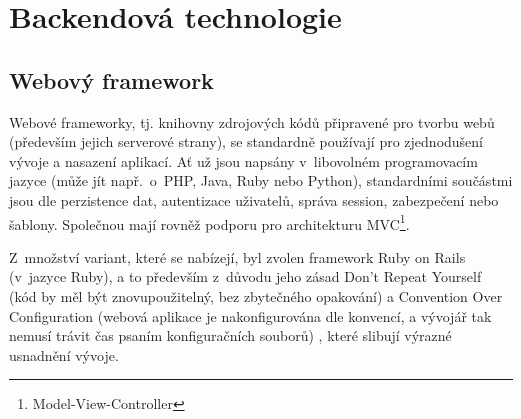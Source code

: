 \documentclass[twoside]{ctuthesis}
\begin{document}
\section{Backendová technologie}

\subsection{Webový framework}

Webové frameworky, tj. knihovny zdrojových kódů připravené pro tvorbu webů (především jejich serverové strany), se standardně používají pro zjednodušení vývoje a nasazení aplikací. Ať už jsou napsány v~libovolném programovacím jazyce (může jít např.~o~PHP, Java, Ruby nebo Python), standardními součástmi jsou dle \cite{docforge2014web} perzistence dat, autentizace uživatelů, správa session, zabezpečení nebo šablony. Společnou mají rovněž podporu pro  architekturu MVC\footnote{Model-View-Controller}.

Z~množství variant, které se nabízejí, byl zvolen framework Ruby on Rails (v~jazyce Ruby), a to především z~důvodu jeho zásad Don't Repeat Yourself (kód by měl být znovupoužitelný, bez zbytečného opakování) a Convention Over Configuration (webová aplikace je nakonfigurována dle konvencí, a vývojář tak nemusí trávit čas psaním konfiguračních souborů) \cite{rails2020}, které slibují výrazné usnadnění vývoje.


%
%
%
%
%
\end{document}
